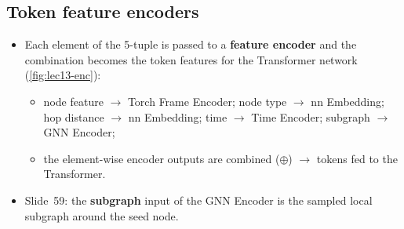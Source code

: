 \subsection{Token feature encoders}\label{sec:lec13-encoders}

\begin{itemize}
  \item Each element of the 5-tuple is passed to a \textbf{feature encoder} and the
    combination becomes the token features for the Transformer network
    (\cref{fig:lec13-enc}):
    \begin{itemize}
      \item node feature $\to$ Torch Frame Encoder; node type $\to$ nn Embedding; hop
        distance $\to$ nn Embedding; time $\to$ Time Encoder; subgraph $\to$ GNN
        Encoder;
      \item the element-wise encoder outputs are combined ($\oplus$) $\to$ tokens fed to
        the Transformer.
    \end{itemize}
  \item Slide~59: the \textbf{subgraph} input of the GNN Encoder is the sampled local
    subgraph around the seed node.
\end{itemize}

